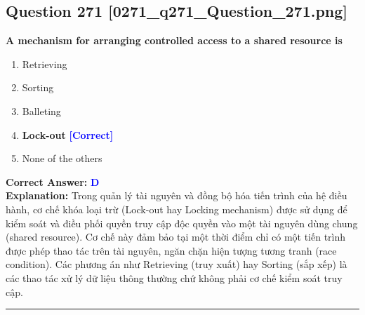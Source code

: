 \documentclass[11pt,a4paper]{article}
\begin{document}
\begin{minipage}{\textwidth}
\subsection*{Question 271 \quad \footnotesize{[0271\_q271\_Question\_271.png]}}
\noindent \textbf{A mechanism for arranging controlled access to a shared resource is}

\begin{enumerate}[label=\Alph*.]
    \item Retrieving
    \item Sorting
    \item Balleting
    \item \textbf{Lock-out} \hfill \textcolor{blue}{\textbf{[Correct]}}
    \item None of the others
\end{enumerate}

\noindent \textbf{Correct Answer:} \textcolor{blue}{\textbf{D}} \\[2pt]
\noindent \textbf{Explanation:} Trong quản lý tài nguyên và đồng bộ hóa tiến trình của hệ điều hành, cơ chế khóa loại trừ (Lock-out hay Locking mechanism) được sử dụng để kiểm soát và điều phối quyền truy cập độc quyền vào một tài nguyên dùng chung (shared resource). Cơ chế này đảm bảo tại một thời điểm chỉ có một tiến trình được phép thao tác trên tài nguyên, ngăn chặn hiện tượng tương tranh (race condition). Các phương án như Retrieving (truy xuất) hay Sorting (sắp xếp) là các thao tác xử lý dữ liệu thông thường chứ không phải cơ chế kiểm soát truy cập.

\par\vspace{0.3cm}
\hrule
\vspace{0.3cm}
\end{minipage}
\end{document}
